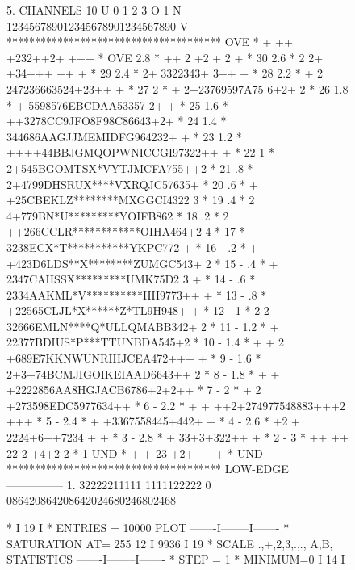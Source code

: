 \begin{figure}[p]
\begin{minipage}[t]{.425\textwidth}
\begin{XMPfrac}{5.}
CHANNELS  10 U 0        1         2         3 O
           1 N 123456789012345678901234567890 V
           **************************************
  OVE      *        + ++ +232++2+ +++           * OVE
    2.8    *      ++ 2    +2 + 2  +             *  30
    2.6    *           2 2+  +34+++ ++   +      *  29
    2.4    *          2+ 3322343+ 3++ +         *  28
    2.2    *    + 2    247236663524+23++   +    *  27
    2      *    +    2+23769597A75 6+2+ 2       *  26
    1.8    *       + 5598576EBCDAA53357  2+ +   *  25
    1.6    *      ++3278CC9JFO8F98C86643+2+     *  24
    1.4    *      344686AAGJJMEMIDFG964232+   + *  23
    1.2    *    ++++44BBJGMQOPWNICCGI97322++  + *  22
    1      *     2+545BGOMTSX*VYTJMCFA755++2    *  21
     .8    *    2+4799DHSRUX****VXRQJC57635+    *  20
     .6    *   + +25CBEKLZ********MXGGCI4322  3 *  19
     .4    * 2   4+779BN*U*********YOIFB862     *  18
     .2    * 2 ++266CCLR************OIHA464+2 4 *  17
           * +  3238ECX*T***********YKPC772   + *  16
-    .2    * + +423D6LDS**X********ZUMGC543+  2 *  15
-    .4    * +  2347CAHSSX*********UMK75D2 3  + *  14
-    .6    *   2334AAKML*V**********IIH9773++ + *  13
-    .8    *   +22565CLJL*X******Z*TL9H948+ +   *  12
-   1      * 2 2 32666EMLN****Q*ULLQMABB342+  2 *  11
-   1.2    *   + 22377BDIUS*P***TTUNBDA545+2    *  10
-   1.4    * + + 2 +689E7KKNWUNRIHJCEA472+++  + *   9
-   1.6    *     2+3+74BCMJIGOIKEIAAD6643++   2 *   8
-   1.8    * + + +2222856AA8HGJACB6786+2+2++    *   7
-   2      *   +   2 +273598EDC5977634++        *   6
-   2.2    * +   + ++2+274977548883+++2 +++     *   5
-   2.4    *         +  +3367558445+442+   +    *   4
-   2.6    *       +2 +  2224+6++7234 +    +    *   3
-   2.8    *          +  33+3+322++ +           *   2
-   3      *       ++ ++ 22 2 +4+2 2            *   1
  UND      *          + +  23 +2+++      +      * UND
           **************************************
LOW-EDGE       ---------------
           1.  32222211111         1111122222
           0   086420864208642024680246802468
 
*                                                   I    19  I
* ENTRIES =    10000            PLOT         -------I--------I-------
* SATURATION  AT=          255                  12  I  9936  I   19
* SCALE  .,+,2,3,.,., A,B,      STATISTICS   -------I--------I-------
* STEP =    1     * MINIMUM=0                       I    14  I
\end{XMPfrac}
\end{minipage}

\bigskip


\end{figure}
